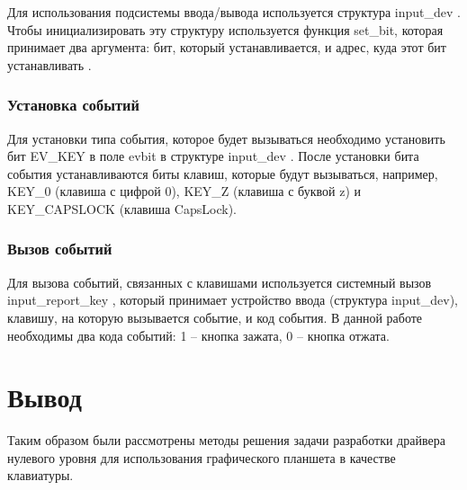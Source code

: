 Для использования подсистемы ввода/вывода используется структура input\_dev \cite{Input_dev}. Чтобы инициализировать эту структуру используется функция set\_bit, которая принимает два аргумента: бит, который устанавливается, и адрес, куда этот бит устанавливать \cite{Setbit}.

\subsubsection{Установка событий}

Для установки типа события, которое будет вызываться необходимо установить бит EV\_KEY \cite{EVkey} в поле evbit в структуре input\_dev \cite{Input_dev}. После установки бита события устанавливаются биты клавиш, которые будут вызываться, например, KEY\_0 (клавиша с цифрой 0), KEY\_Z (клавиша с буквой z) и KEY\_CAPSLOCK (клавиша CapsLock).

\subsubsection{Вызов событий}

Для вызова событий, связанных с клавишами используется системный вызов input\_report\_key \cite{Input_report_key}, который принимает устройство ввода (структура input\_dev), клавишу, на которую вызывается событие, и код события. В данной работе необходимы два кода событий: 1 -- кнопка зажата, 0 -- кнопка отжата.

\section{Вывод}

Таким образом были рассмотрены методы решения задачи разработки драйвера нулевого уровня для использования графического планшета в качестве клавиатуры.
